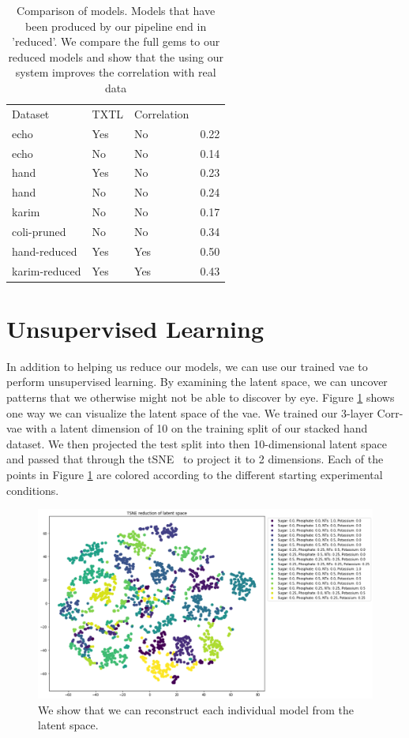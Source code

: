 \begin{table}[t]
\centering
\caption{Comparison of models.
Models that have been produced by our pipeline end in 'reduced'.
We compare the full \glspl{gem} to our reduced models and show that the using our system improves the correlation with real data}
\label{tab:cmp}
\begin{tabular}{llll}
Dataset & TXTL & Correlation \\
echo    & Yes   & No        & 0.22        \\
echo    & No    & No        & 0.14        \\
hand    & Yes    & No        &   0.23     \\
hand    & No   & No        &   0.24     \\
karim   & No    & No        & 0.17      \\
coli-pruned & No & No & 0.34 \\
hand-reduced & Yes & Yes & 0.50 \\
karim-reduced & Yes & Yes & 0.43 
\end{tabular}
\end{table}

\section{Unsupervised Learning}

In addition to helping us reduce our models, we can use our trained \gls{vae} to perform unsupervised learning.
By examining the latent space, we can uncover patterns that we otherwise might not be able to discover by eye.
Figure \ref{fig:ingest} shows one way we can visualize the latent space of the \gls{vae}.
We trained our 3-layer Corr-\gls{vae} with a latent dimension of 10 on the training split of our stacked hand dataset.
We then projected the test split into then 10-dimensional latent space and passed that through the tSNE~\cite{maaten2008visualizing} to project it to 2 dimensions.
Each of the points in Figure \ref{fig:ingest} are colored according to the different starting experimental conditions.

\begin{figure}[t!]
\begin{center}
\includegraphics{figs/TSNE_hand_latent10.png}
\caption{We show that we can reconstruct each individual model from the latent space.}
\end{center}
\label{fig:ingest}
\end{figure}

